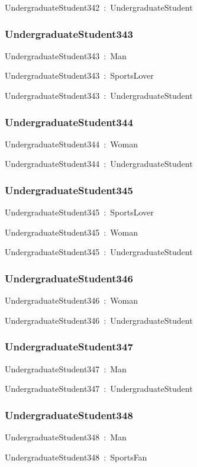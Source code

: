 \documentclass{article}
\begin{document}
UndergraduateStudent342~:~UndergraduateStudent

\subsubsection*{UndergraduateStudent343}

UndergraduateStudent343~:~Man

UndergraduateStudent343~:~SportsLover

UndergraduateStudent343~:~UndergraduateStudent

\subsubsection*{UndergraduateStudent344}

UndergraduateStudent344~:~Woman

UndergraduateStudent344~:~UndergraduateStudent

\subsubsection*{UndergraduateStudent345}

UndergraduateStudent345~:~SportsLover

UndergraduateStudent345~:~Woman

UndergraduateStudent345~:~UndergraduateStudent

\subsubsection*{UndergraduateStudent346}

UndergraduateStudent346~:~Woman

UndergraduateStudent346~:~UndergraduateStudent

\subsubsection*{UndergraduateStudent347}

UndergraduateStudent347~:~Man

UndergraduateStudent347~:~UndergraduateStudent

\subsubsection*{UndergraduateStudent348}

UndergraduateStudent348~:~Man

UndergraduateStudent348~:~SportsFan
\end{document}
